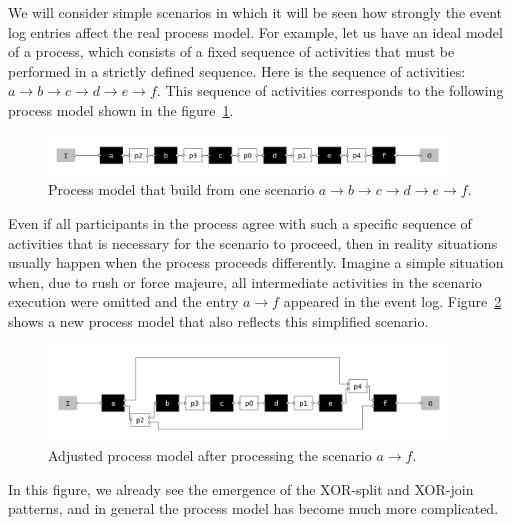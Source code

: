 \documentclass[
11pt,%
tightenlines,%
twoside,%
onecolumn,%
nofloats,%
nobibnotes,%
nofootinbib,%
superscriptaddress,%
noshowpacs,%
centertags]%
{revtex4}
\begin{document}
We will consider simple scenarios in which it will be seen how strongly the event log entries affect the real process model.
For example, let us have an ideal model of a process, which consists of a fixed sequence of activities that must be performed in a strictly defined sequence.
Here is the sequence of activities: $a \rightarrow b \rightarrow c \rightarrow d \rightarrow e \rightarrow f$.
This sequence of activities corresponds to the following process model shown in the figure~\ref{fig:origin1}.

\begin{figure}[h]
\setcaptionmargin{5mm}
\includegraphics[width=0.95\textwidth]{pics/origin1.png}
\caption{Process model that build from one scenario $a \rightarrow b \rightarrow c \rightarrow d \rightarrow e \rightarrow f$.}
\label{fig:origin1}
\end{figure}

Even if all participants in the process agree with such a specific sequence of activities that is necessary for the scenario to proceed, then in reality situations usually happen when the process proceeds differently.
Imagine a simple situation when, due to rush or force majeure, all intermediate activities in the scenario execution were omitted and the entry $a \rightarrow f$ appeared in the event log.
Figure~\ref{fig:second1} shows a new process model that also reflects this simplified scenario.

\begin{figure}[h]
\setcaptionmargin{5mm}
\includegraphics[width=0.95\textwidth]{pics/second1.png}
\caption{Adjusted process model after processing the scenario $a \rightarrow f$.}
\label{fig:second1}
\end{figure}

In this figure, we already see the emergence of the XOR-split and XOR-join patterns, and in general the process model has become much more complicated.
\end{document}
